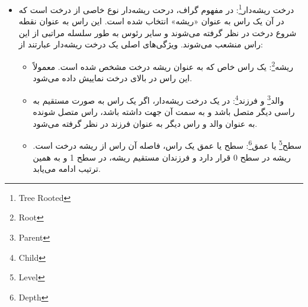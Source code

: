 \documentclass[a4paper,10pt]{article}
\begin{document}
\begin{itemize}
        \begin{enumerate}
            
            \item یک لیست از رئوس شامل همه رئوس 1 تا n و رئوس موجود در دنباله پروفر ایجاد می‌کنیم.

            \item کوچک‌ترین راسی که در دنباله پروفر نیست را پیدا می‌کنیم و با اولین عنصر دنباله پروفر که در لیست اولیه ما نیست یک یال ایجاد می‌کنیم.

            \item آن عنصر دنباله پروفر و لیست اولیه را حذف می‌کنیم.

            \item مراحل 1 تا 3 را تکرار می‌کنیم تا دنباله پروفر خالی از عضو شود و سپس دو راس باقی مانده را با یک یال متصل می‌کنیم.

        \end{enumerate}

        \item درخت ریشه‌دار\footnote{\hspace{2pt}Tree Rooted}: در مفهوم گراف‌، درحت ریشه‌دار نوع خاصی از درخت است که در آن یک راس به عنوان «ریشه» انتخاب شده است. این راس به عنوان نقطه شروع درخت در نظر گرفته می‌شوند و سایر رئوس به طور سلسله مراتبی از این راس منشعب می‌شوند. ویژگی‌های اصلی یک درخت ریشه‌دار عبارتند از:
        
        \begin{itemize}
            
            \item ریشه\footnote{\hspace{2pt}Root}: یک راس خاص که به عنوان ریشه درخت مشخص شده است. معمولاً این راس در بالای درخت نماییش داده می‌شود.
            
            \item والد\footnote{\hspace{2pt}Parent} و فرزند\footnote{\hspace{2pt}Child}: در یک درخت ریشه‌دار، اگر یک راس به صورت مستقیم به راسی دیگر متصل باشد و به سمت آن جهت داشته باشد، راس متصل شونده به عنوان والد و راس دیگر به عنوان فرزند در نظر گرفته می‌شود.

            \item سطح\footnote{\hspace{2pt}Level} یا عمق\footnote{\hspace{2pt}Depth}: سطح یا عمق یک راس، فاصله آن راس از ریشه درخت است. ریشه در سطح 0 قرار دارد و فرزندان مستقیم ریشه، در سطح 1 و به همین ترتیب ادامه می‌یابد.


\end{itemize}
\end{itemize}
\end{document}
